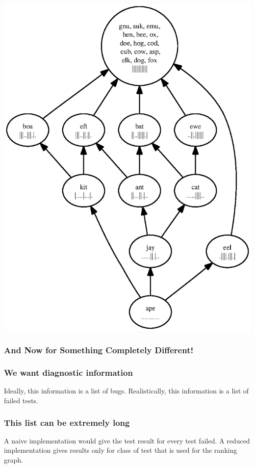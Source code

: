 \documentclass[svgnames,14pt]{beamer}
\theoremstyle{definition}
\begin{document}
\begin{frame}
\centerline{\includegraphics[height=\textheight]{success.ps}}
\end{frame}

\begin{frame}
\frametitle{And Now for Something Completely Different!}
\end{frame}

\begin{frame}
\frametitle{We want diagnostic information}
Ideally, this information is a list of bugs.
\newline\newline
Realistically, this information is a list of failed tests.
\end{frame}

\begin{frame}
\frametitle{This list can be extremely long}
A naive implementation would give the test result for every test failed.
\newline\newline
A reduced implementation gives results only for class of test that is used for the ranking graph.
\end{frame}
\end{document}
